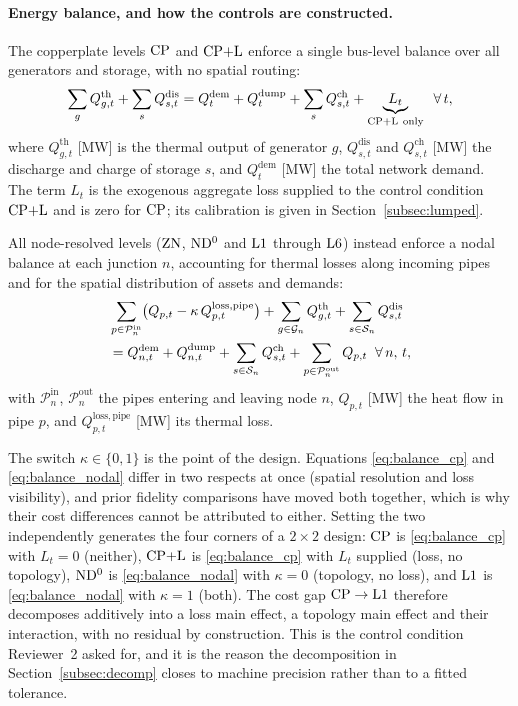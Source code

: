 \paragraph{Energy balance, and how the controls are constructed.}
The copperplate levels $\mathrm{CP}$ and $\mathrm{CP{+}L}$ enforce a single bus-level balance over all
generators and storage, with no spatial routing:
%
\begin{equation}
  \sum_{g} Q_{g,t}^{\mathrm{th}}
    + \sum_{s} Q_{s,t}^{\mathrm{dis}}
  = Q_t^{\mathrm{dem}} + Q_t^{\mathrm{dump}}
    + \sum_{s} Q_{s,t}^{\mathrm{ch}}
  + \underbrace{L_t}_{\mathrm{CP{+}L}\ \mathrm{only}}
  \;\; \forall\, t,
  \label{eq:balance_cp}
\end{equation}
%
where $Q_{g,t}^{\mathrm{th}}$ [MW] is the thermal output of generator $g$,
$Q_{s,t}^{\mathrm{dis}}$ and $Q_{s,t}^{\mathrm{ch}}$ [MW] the discharge and charge of
storage $s$, and $Q_t^{\mathrm{dem}}$ [MW] the total network demand. The term $L_t$ is
the exogenous aggregate loss supplied to the control condition $\mathrm{CP{+}L}$ and is zero for
$\mathrm{CP}$; its calibration is given in Section~\ref{subsec:lumped}.

All node-resolved levels ($\mathrm{ZN}$, $\mathrm{ND^{0}}$ and $\mathrm{L1}$ through $\mathrm{L6}$) instead enforce
a nodal balance at each junction $n$, accounting for thermal losses along incoming pipes
and for the spatial distribution of assets and demands:
%
\begin{align}
  &\sum_{p \in \mathcal{P}_n^{\mathrm{in}}}
    \bigl(Q_{p,t} - \kappa\, Q_{p,t}^{\mathrm{loss,pipe}}\bigr)
  + \sum_{g \in \mathcal{G}_n} Q_{g,t}^{\mathrm{th}}
  + \sum_{s \in \mathcal{S}_n} Q_{s,t}^{\mathrm{dis}} \notag \\
  &= Q_{n,t}^{\mathrm{dem}} + Q_{n,t}^{\mathrm{dump}}
  + \sum_{s \in \mathcal{S}_n} Q_{s,t}^{\mathrm{ch}}
  + \sum_{p \in \mathcal{P}_n^{\mathrm{out}}} Q_{p,t}
  \;\; \forall\, n,\, t,
  \label{eq:balance_nodal}
\end{align}
%
with $\mathcal{P}_n^{\mathrm{in}}$, $\mathcal{P}_n^{\mathrm{out}}$ the pipes entering and
leaving node $n$, $Q_{p,t}$ [MW] the heat flow in pipe $p$, and
$Q_{p,t}^{\mathrm{loss,pipe}}$ [MW] its thermal loss.

The switch $\kappa \in \{0,1\}$ is the point of the design. Equations
\eqref{eq:balance_cp} and \eqref{eq:balance_nodal} differ in two respects at once
(spatial resolution and loss visibility), and prior fidelity comparisons have moved both
together, which is why their cost differences cannot be attributed to either. Setting the
two independently generates the four corners of a $2\times2$ design: $\mathrm{CP}$ is
\eqref{eq:balance_cp} with $L_t = 0$ (neither), $\mathrm{CP{+}L}$ is \eqref{eq:balance_cp} with
$L_t$ supplied (loss, no topology), $\mathrm{ND^{0}}$ is \eqref{eq:balance_nodal} with $\kappa = 0$
(topology, no loss), and $\mathrm{L1}$ is \eqref{eq:balance_nodal} with $\kappa = 1$ (both).
The cost gap $\mathrm{CP} \to \mathrm{L1}$ therefore decomposes additively into a loss main effect, a
topology main effect and their interaction, with no residual by construction. This is the
control condition Reviewer~2 asked for, and it is the reason the decomposition in
Section~\ref{subsec:decomp} closes to machine precision rather than to a fitted
tolerance.

